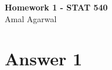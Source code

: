 \documentclass[12pt]{article}
\date{}
\begin{document}

\newtheorem{thm}{Theorem}[section]
\newtheorem{cor}[thm]{Corollary}
\newtheorem{lem}[thm]{Lemma}
\newtheorem{prop}[thm]{Proposition}
\newtheorem{defn}[thm]{Definition}
\newtheorem{exam}[thm]{Example}
\newtheorem{qstn}[thm]{Question}

\newpage
\begin{center}
{\bf Homework 1 - STAT 540}\\
Amal Agarwal
\end{center}
\section*{Answer 1}
\end{document}

